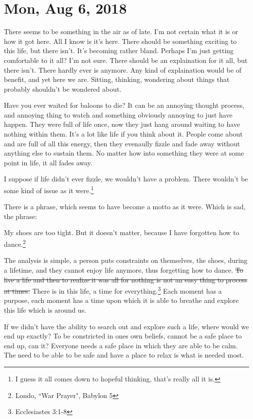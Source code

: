 \section{Mon, Aug 6, 2018}

There seems to be something in the air as of late. I'm not certain what it is or how
it got here. All I know is it's here. There should be something exciting to this
life, but there isn't. It's becoming rather bland. Perhaps I'm just getting
comfortable to it all? I'm not sure. There should be an explaination for it all, but
there isn't. There hardly ever is anymore. Any kind of explaination would be of
benefit, and yet here we are. Sitting, thinking, wondering about things that probably
shouldn't be wondered about.

Have you ever waited for baloons to die? It can be an annoying thought process, and
annoying thing to watch and something obviously annoying to just have happen. They
were full of life once, now they just hang around waiting to have nothing within
them. It's a lot like life if you think about it. People come about and are full of
all this energy, then they evenaully fizzle and fade away without anything else to
sustain them. No matter how into something they were at some point in life, it all
fades away.

I suppose if life didn't ever fizzle, we wouldn't have a problem. There wouldn't be
some kind of issue as it were.\footnote{I guess it all comes down to hopeful
thinking, that's really all it is.}

There is a phrase, which seems to have become a motto as it were. Which is sad, the
phrase:

\begin{displayquote}
My shoes are too tight. But it doesn't matter, because I have forgotten how to 
dance.\footnote{Londo, ``War Prayer", Babylon 5}
\end{displayquote}

The analysis is simple, a person puts constraints on themselves, the shoes, during a
lifetime, and they cannot enjoy life anymore, thus forgetting how to dance. \st{To 
live a life and then to realize it was all for nothing is not an easy thing to
process at times.} There is in this life, a time for everything.\footnote{
Ecclesiastes 3:1-8} Each moment has a purpose, each moment has a time upon which it 
is able to breathe and explore this life which is around us.

If we didn't have the ability to search out and explore such a life, where would we
end up exactly? To be constricted in ones own beliefs, cannot be a safe place to end
up, can it? Everyone needs a safe place in which they are able to be calm. The need
to be able to be safe and have a place to relax is what is needed most.